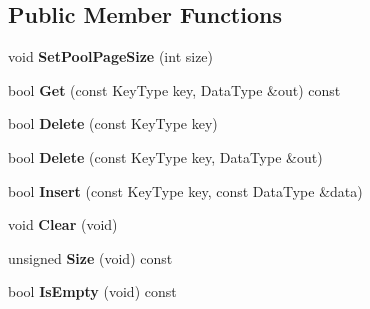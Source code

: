 \subsection*{Public Member Functions}
\begin{DoxyCompactItemize}
\item 
\hypertarget{class_data_structures_1_1_b_plus_tree_aa0ecdf41d260dd15cf57dec86052f35f}{void {\bfseries Set\-Pool\-Page\-Size} (int size)}\label{class_data_structures_1_1_b_plus_tree_aa0ecdf41d260dd15cf57dec86052f35f}

\item 
\hypertarget{class_data_structures_1_1_b_plus_tree_aee8a1b00f0ed25dc368dd464364a0098}{bool {\bfseries Get} (const Key\-Type key, Data\-Type \&out) const }\label{class_data_structures_1_1_b_plus_tree_aee8a1b00f0ed25dc368dd464364a0098}

\item 
\hypertarget{class_data_structures_1_1_b_plus_tree_a93480fa15a725c118927b4348eaa3197}{bool {\bfseries Delete} (const Key\-Type key)}\label{class_data_structures_1_1_b_plus_tree_a93480fa15a725c118927b4348eaa3197}

\item 
\hypertarget{class_data_structures_1_1_b_plus_tree_a090dbcd47c705a995e5b1c8edef2c95c}{bool {\bfseries Delete} (const Key\-Type key, Data\-Type \&out)}\label{class_data_structures_1_1_b_plus_tree_a090dbcd47c705a995e5b1c8edef2c95c}

\item 
\hypertarget{class_data_structures_1_1_b_plus_tree_abbfee8f6cb57f3a4b855c7b880196015}{bool {\bfseries Insert} (const Key\-Type key, const Data\-Type \&data)}\label{class_data_structures_1_1_b_plus_tree_abbfee8f6cb57f3a4b855c7b880196015}

\item 
\hypertarget{class_data_structures_1_1_b_plus_tree_abe3120d0a4822be3eca4e9835d9d2a1a}{void {\bfseries Clear} (void)}\label{class_data_structures_1_1_b_plus_tree_abe3120d0a4822be3eca4e9835d9d2a1a}

\item 
\hypertarget{class_data_structures_1_1_b_plus_tree_a350138159df5e5f885a30270ef1409dc}{unsigned {\bfseries Size} (void) const }\label{class_data_structures_1_1_b_plus_tree_a350138159df5e5f885a30270ef1409dc}

\item 
\hypertarget{class_data_structures_1_1_b_plus_tree_ac8e7b0969a81b3fffc8a8d0933bf55e8}{bool {\bfseries Is\-Empty} (void) const }\label{class_data_structures_1_1_b_plus_tree_ac8e7b0969a81b3fffc8a8d0933bf55e8}


\end{DoxyCompactItemize}
